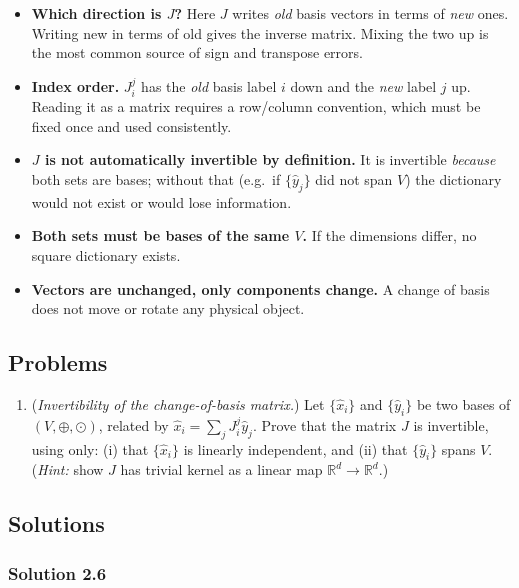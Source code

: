 \documentclass[11pt]{article}
\newcommand{\Vsp}{(V, \oplus, \odot)}
\begin{document}
\begin{itemize}
  \item \textbf{Which direction is $J$?} Here $J$ writes \emph{old} basis vectors in terms of \emph{new} ones. Writing new in terms of old gives the inverse matrix. Mixing the two up is the most common source of sign and transpose errors.
  \item \textbf{Index order.} $J^j_i$ has the \emph{old} basis label $i$ down and the \emph{new} label $j$ up. Reading it as a matrix requires a row/column convention, which must be fixed once and used consistently.
  \item \textbf{$J$ is not automatically invertible by definition.} It is invertible \emph{because} both sets are bases; without that (e.g.\ if $\{\hat y_j\}$ did not span $V$) the dictionary would not exist or would lose information.
  \item \textbf{Both sets must be bases of the same $V$.} If the dimensions differ, no square dictionary exists.
  \item \textbf{Vectors are unchanged, only components change.} A change of basis does not move or rotate any physical object.
\end{itemize}

\subsection*{Problems}

\begin{enumerate}[label=\textbf{2.\arabic*}, leftmargin=2.2cm, start=6]

\item \label{prob:J-invertible}
(\textit{Invertibility of the change-of-basis matrix.})
Let $\{\hat{x}_i\}$ and $\{\hat{y}_i\}$ be two bases of $\Vsp$, related by $\hat{x}_i = \sum_j J_i^j \hat{y}_j$. Prove that the matrix $J$ is invertible, using only: (i) that $\{\hat{x}_i\}$ is linearly independent, and (ii) that $\{\hat{y}_i\}$ spans $V$. (\emph{Hint:} show $J$ has trivial kernel as a linear map $\mathbb{R}^d \to \mathbb{R}^d$.)

\end{enumerate}

\subsection*{Solutions}

\subsubsection*{Solution 2.6}
\end{document}
